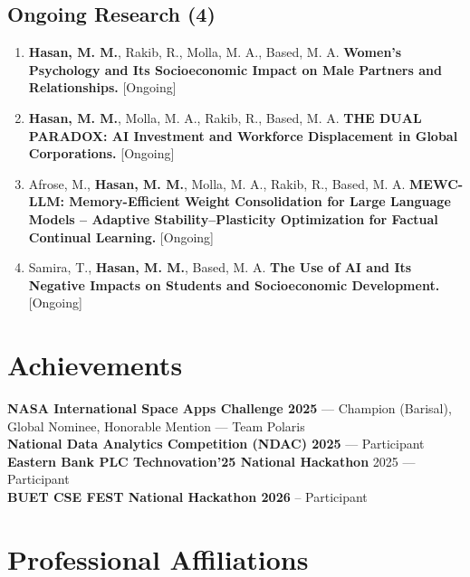 \documentclass[a4paper,11pt]{article}
\begin{document}
\subsection*{\normalsize Ongoing Research \textnormal{(4)}}
\begin{enumerate}[leftmargin=1.5em, itemsep=6pt, topsep=0pt, resume]

\item \textbf{Hasan, M. M.}, Rakib, R., Molla, M. A., Based, M. A.
\textbf{Women's Psychology and Its Socioeconomic Impact on Male Partners and Relationships.}
[Ongoing]

\item \textbf{Hasan, M. M.}, Molla, M. A., Rakib, R., Based, M. A.
\textbf{THE DUAL PARADOX: AI Investment and Workforce Displacement in Global Corporations.}
[Ongoing]

\item Afrose, M., \textbf{Hasan, M. M.}, Molla, M. A., Rakib, R., Based, M. A.
\textbf{MEWC-LLM: Memory-Efficient Weight Consolidation for Large Language Models -- Adaptive Stability--Plasticity Optimization for Factual Continual Learning.}
[Ongoing]

\item Samira, T., \textbf{Hasan, M. M.}, Based, M. A.
\textbf{The Use of AI and Its Negative Impacts on Students and Socioeconomic Development.}
[Ongoing]

\end{enumerate}

\section{Achievements}

\textbf{NASA International Space Apps Challenge 2025} — Champion (Barisal), Global Nominee, Honorable Mention — \textcolor{teamgreen}{Team Polaris} \\
\textbf{National Data Analytics Competition (NDAC) 2025} — Participant\\
\textbf{Eastern Bank PLC Technovation’25 National Hackathon} 2025 — Participant \\
\textbf{BUET CSE FEST National Hackathon 2026 } -- Participant

\section{Professional Affiliations}
\end{document}
